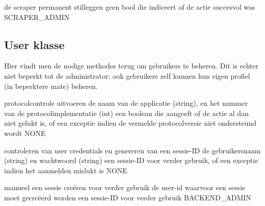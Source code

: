 	{ de scraper permanent stilleggen }
	{ geen }
	{ bool die indiceert of de actie succesvol was }
	{ SCRAPER\_ADMIN }


\subsection{User klasse}

Hier vindt men de nodige methodes terug om gebruikers te beheren. Dit is echter niet beperkt tot de administrator: ook gebruikers zelf kunnen hun eigen profiel (in beperktere mate) beheren.

	{ protocolcontrole uitvoeren }
	{ de naam van de applicatie (string), en het nummer van de protocolimplementatie (int) }
	{ een boolean die aangeeft of de actie al dan niet gelukt is, of een exceptie indien de vermelde protocolversie niet ondersteund wordt }
	{ NONE }
	
	{ controleren van user credentials en genereren van een sessie-ID }
	{ de gebruikersnaam (string) en wachtwoord (string) }
	{ een sessie-ID voor verder gebruik, of een exceptie indien het aanmelden mislukt is }
	{ NONE }
		
	{ manueel een sessie cre\"eren voor verder gebruik }
	{ de user-id waarvoor een sessie moet gecre\"eerd worden }
	{ een sessie-ID voor verder gebruik }
	{ BACKEND\_ADMIN }

